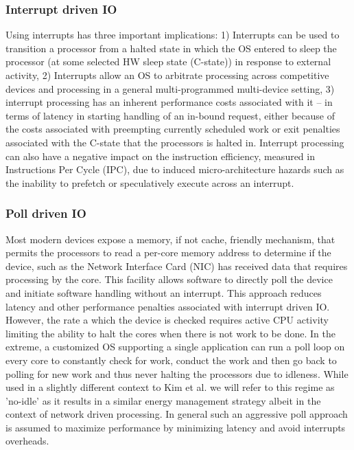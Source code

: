 \subsubsection{Interrupt driven IO}
Using interrupts has three important implications: 1) Interrupts can be used to transition a processor from a halted state in which the OS entered to sleep the processor (at some selected HW sleep state (C-state)) in response to external activity, 2)  Interrupts allow an OS to arbitrate processing across competitive devices and processing in a general multi-programmed multi-device setting, 3) interrupt processing has an inherent performance costs associated with it -- in terms of latency in starting handling of an in-bound request, either because of the costs associated with preempting currently scheduled work\cite{intelpaper} or exit penalties associated with the C-state that the processors is halted in\cite{}.  Interrupt processing can also have a negative impact on the instruction efficiency, measured in Instructions Per Cycle (IPC), due to induced micro-architecture hazards such as the inability to prefetch or speculatively execute across an interrupt.

\subsubsection{Poll driven IO}

Most modern devices expose a memory, if not cache, friendly mechanism, that permits the processors to read a per-core memory address to determine if the device, such as the Network Interface Card (NIC) has received data that requires processing by the core.  This facility allows software to directly poll the device and initiate software handling without an interrupt.  This approach reduces latency and other performance penalties associated with interrupt driven IO.  However, the rate a which the device is checked requires active CPU activity limiting the ability to halt the cores when there is not work to be done.  In the extreme, a customized OS supporting a single application can run a poll loop on every core to constantly check for work, conduct the work and then go back to polling for new work and thus never halting the processors due to idleness.   While used in a slightly different context to Kim et al.\cite{hank} we will refer to this regime as 'no-idle' as it results in a similar energy management strategy albeit in the context of network driven processing.  In general such an aggressive poll approach is assumed to maximize performance by minimizing latency and avoid interrupts overheads.

